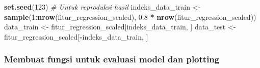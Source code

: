 \documentclass[
]{article}
\newenvironment{Shaded}{\begin{snugshade}}{\end{snugshade}}
\newcommand{\CommentTok}[1]{\textcolor[rgb]{0.56,0.35,0.01}{\textit{#1}}}
\newcommand{\DecValTok}[1]{\textcolor[rgb]{0.00,0.00,0.81}{#1}}
\newcommand{\FloatTok}[1]{\textcolor[rgb]{0.00,0.00,0.81}{#1}}
\newcommand{\FunctionTok}[1]{\textcolor[rgb]{0.13,0.29,0.53}{\textbf{#1}}}
\newcommand{\NormalTok}[1]{#1}
\newcommand{\OtherTok}[1]{\textcolor[rgb]{0.56,0.35,0.01}{#1}}
\newcommand{\SpecialCharTok}[1]{\textcolor[rgb]{0.81,0.36,0.00}{\textbf{#1}}}
\begin{document}
\begin{Shaded}
\begin{Highlighting}[]
\FunctionTok{set.seed}\NormalTok{(}\DecValTok{123}\NormalTok{)  }\CommentTok{\# Untuk reproduksi hasil}
\NormalTok{indeks\_data\_train }\OtherTok{\textless{}{-}} \FunctionTok{sample}\NormalTok{(}\DecValTok{1}\SpecialCharTok{:}\FunctionTok{nrow}\NormalTok{(fitur\_regression\_scaled), }\FloatTok{0.8} \SpecialCharTok{*} \FunctionTok{nrow}\NormalTok{(fitur\_regression\_scaled))}
\NormalTok{data\_train }\OtherTok{\textless{}{-}}\NormalTok{ fitur\_regression\_scaled[indeks\_data\_train, ]}
\NormalTok{data\_test }\OtherTok{\textless{}{-}}\NormalTok{ fitur\_regression\_scaled[}\SpecialCharTok{{-}}\NormalTok{indeks\_data\_train, ]}
\end{Highlighting}
\end{Shaded}

\hypertarget{membuat-fungsi-untuk-evaluasi-model-dan-plotting}{%
\subsubsection{Membuat fungsi untuk evaluasi model dan
plotting}\label{membuat-fungsi-untuk-evaluasi-model-dan-plotting}}
\end{document}
